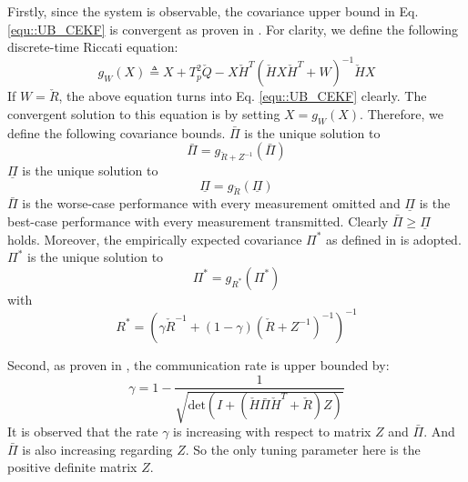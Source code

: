 \documentclass[conference]{IEEEtran}
\begin{document}
Firstly, since the system is observable, the covariance upper bound in Eq. \eqref{equ::UB_CEKF} is convergent as proven in \cite{mourikis2006performance,chang2018optimal}.
For clarity, we define the following discrete-time Riccati equation:
\begin{equation}
g_W (X) \triangleq X + T_p^2 \check{Q} - X\check{H}^T( \check{H} X \check{H}^T + W)^{-1}\check{H}X
\end{equation}
If $W = \check{R}$, the above equation turns into Eq. \eqref{equ::UB_CEKF} clearly.
The convergent solution to this equation is by setting $X = g_W(X)$.
Therefore, we define the following covariance bounds.
$\bar{\Pi}$ is the unique solution to
\begin{equation}
	\bar{\Pi} = g_{\check{R}+Z^{-1}} (\bar{\Pi})
\end{equation}
$\underline{\Pi}$ is the unique solution to
\begin{equation}
\underline{\Pi} = g_{\check{R}} (\underline{\Pi})
\end{equation}
$\bar{\Pi}$ is the worse-case performance with every measurement omitted and $\underline{\Pi}$ is the best-case performance with every measurement transmitted.
Clearly $\bar{\Pi} \geq \underline{\Pi}$ holds.
Moreover, the empirically expected covariance $\Pi^*$ as defined in \cite{han2015stochastic} is adopted.
$\Pi^*$ is the unique solution to
\begin{equation}
	\Pi^* = g_{R^*}(\Pi^*)
\end{equation}
with
\begin{equation}
	R^* = (\gamma \check{R}^{-1} + (1-\gamma) (\check{R} + Z^{-1})^{-1} ) ^{-1}
\end{equation}

Second, as proven in \cite{han2013stochastic,han2015stochastic}, the communication rate is upper bounded by:
\begin{equation}
	\gamma = 1 - \frac{1}{\sqrt{\text{det}(I + (\check{H}\bar{\Pi}\check{H}^T + \check{R} )Z )}}
\end{equation}
It is observed that the rate $\gamma$ is increasing with respect to matrix $Z$ and $\bar{\Pi}$.
And $\bar{\Pi}$ is also increasing regarding $Z$.
So the only tuning parameter here is the positive definite matrix $Z$.
\end{document}
